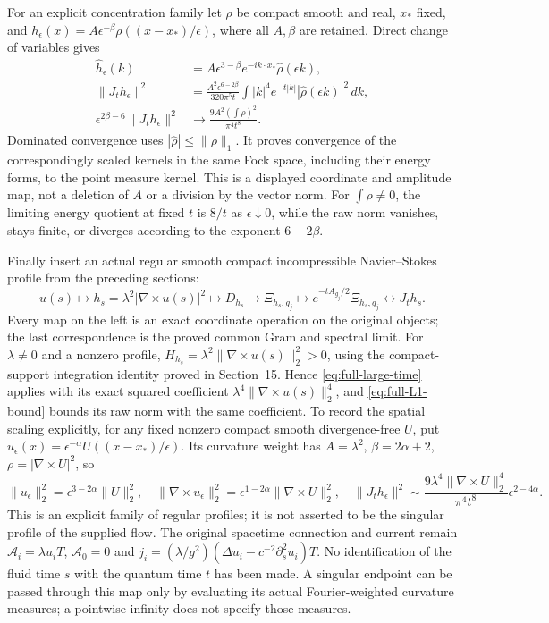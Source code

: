 For an explicit concentration family let $\rho$ be compact smooth
and real, $x_*$ fixed, and
$h_\epsilon(x)=A\epsilon^{-\beta}\rho((x-x_*)/\epsilon)$,
where all $A,\beta$ are retained. Direct change of variables gives
\begin{align}
 \widehat h_\epsilon(k)
   &=A\epsilon^{3-\beta}e^{-ik\cdot x_*}\widehat\rho(\epsilon k),
       \nonumber\\
 \|J_t h_\epsilon\|^2
   &= \frac{A^2\epsilon^{6-2\beta}}{320\pi^5t}
       \int |k|^4e^{-t|k|}|\widehat\rho(\epsilon k)|^2\,dk,
       \label{eq:full-concentration}\\
 \epsilon^{2\beta-6}\|J_t h_\epsilon\|^2
   &\longrightarrow \frac{9A^2(\int\rho)^2}{\pi^4t^8}.
       \nonumber
\end{align}
Dominated convergence uses $|\widehat\rho|\le\|\rho\|_1$.
It proves convergence of the correspondingly scaled kernels in
the same Fock space, including their energy forms, to the point
measure kernel. This is a displayed coordinate and amplitude map,
not a deletion of $A$ or a division by the vector norm. For
$\int\rho\ne0$, the limiting energy quotient at fixed $t$ is
$8/t$ as $\epsilon\downarrow0$, while the raw norm vanishes,
stays finite, or diverges according to the exponent $6-2\beta$.

Finally insert an actual regular smooth compact incompressible
Navier--Stokes profile from the preceding sections:
\begin{equation}\label{eq:full-NS-chain}
 u(s)\longmapsto h_s=\lambda^2|\nabla\times u(s)|^2
 \longmapsto D_{h_s}\longmapsto\Xi_{h_s,g_j}
 \longmapsto e^{-tA_{g_j}/2}\Xi_{h_s,g_j}
 \longleftrightarrow J_t h_s .
\end{equation}
Every map on the left is an exact coordinate operation on the
original objects; the last correspondence is the proved common
Gram and spectral limit. For $\lambda\ne0$ and a nonzero profile,
$H_{h_s}=\lambda^2\|\nabla\times u(s)\|_2^2>0$, using the
compact-support integration identity proved in Section~15. Hence
\eqref{eq:full-large-time} applies with its exact squared
coefficient $\lambda^4\|\nabla\times u(s)\|_2^4$, and
\eqref{eq:full-L1-bound} bounds its raw norm with the same
coefficient. To record the spatial scaling explicitly, for any
fixed nonzero compact smooth divergence-free $U$, put
$u_\epsilon(x)=\epsilon^{-\alpha}U((x-x_*)/\epsilon)$.
Its curvature weight has $A=\lambda^2$,
$\beta=2\alpha+2$, $\rho=|\nabla\times U|^2$, so
\[
 \|u_\epsilon\|_2^2=\epsilon^{3-2\alpha}\|U\|_2^2,
 \quad \|\nabla\times u_\epsilon\|_2^2
          =\epsilon^{1-2\alpha}\|\nabla\times U\|_2^2,
 \quad \|J_t h_\epsilon\|^2
       \sim \frac{9\lambda^4\|\nabla\times U\|_2^4}{\pi^4t^8}
                    \epsilon^{2-4\alpha}.
\]
This is an explicit family of regular profiles; it is not asserted
to be the singular profile of the supplied flow. The original
spacetime connection and current remain
$\mathcal A_i=\lambda u_iT$, $\mathcal A_0=0$ and
$j_i=(\lambda/g^2)(\Delta u_i-c^{-2}\partial_s^2u_i)T$.
No identification of the fluid time $s$ with the quantum time $t$
has been made. A singular endpoint can be passed through this
map only by evaluating its actual Fourier-weighted curvature
measures; a pointwise infinity does not specify those measures.

